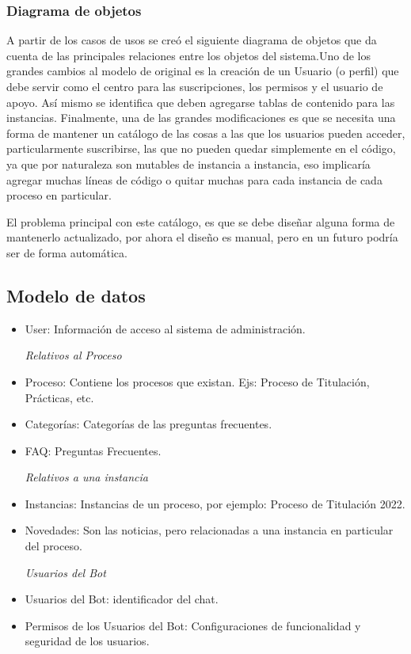 
    \subsubsection{Diagrama de objetos}

    \par A partir de los casos de usos se creó el siguiente diagrama de objetos que da cuenta de las principales relaciones entre los objetos del sistema.Uno de los grandes cambios al modelo de original es la creación de un Usuario (o perfil) que debe servir como el centro para las suscripciones, los permisos y el usuario de apoyo. Así mismo se identifica que deben agregarse tablas de contenido para las instancias. Finalmente, una de las grandes modificaciones es que se necesita una forma de mantener un catálogo de las cosas a las que los usuarios pueden acceder, particularmente suscribirse, las que no pueden quedar simplemente en el código, ya que por naturaleza son mutables de instancia a instancia, eso implicaría agregar muchas líneas de código o quitar muchas para cada instancia de cada proceso en particular.
    \par El problema principal con este catálogo, es que se debe diseñar alguna forma de mantenerlo actualizado, por ahora el diseño es manual, pero en un futuro podría ser de forma automática.

    \subsection{Modelo de datos}
    \begin{itemize}
        \item User: Información de acceso al sistema de administración.
        \vspace{3mm}
        \par \textit{Relativos al Proceso}
        \item Proceso: Contiene los procesos que existan. Ejs: Proceso de Titulación, Prácticas, etc.
        \item Categorías: Categorías de las preguntas frecuentes.
        \item FAQ: Preguntas Frecuentes.
        \vspace{3mm}
        \par \textit{Relativos  a una instancia}
        \item Instancias: Instancias de un proceso, por ejemplo: Proceso de Titulación 2022.
        \item Novedades: Son las noticias, pero relacionadas a una instancia en particular del proceso.
        \vspace{3mm}
        \par \textit{Usuarios del Bot}
        \item Usuarios del Bot: identificador del chat.
        \item Permisos de los Usuarios del Bot: Configuraciones de funcionalidad y seguridad de los usuarios.
    \end{itemize}
    
    
